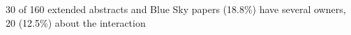30 of 160 extended abstracts and Blue Sky papers (18.8\%) have several owners, 20 (12.5\%) about the interaction